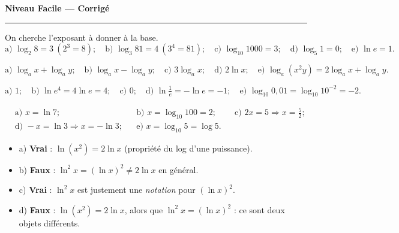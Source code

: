 \documentclass[11pt,a4paper]{article}
\begin{document}
\begin{center}
{\LARGE\bfseries\color{primarydark} Niveau Facile — Corrigé}\\[2pt]
{\color{primary}\rule{0.45\textwidth}{1.2pt}}
\end{center}
\vspace{1mm}

\begin{corrige}[la définition]
On cherche l'exposant à donner à la base.
\[ \text{a) }\log_2 8=3\ (2^3=8);\quad \text{b) }\log_3 81=4\ (3^4=81);\quad \text{c) }\log_{10}1000=3;\quad
   \text{d) }\log_5 1=0;\quad \text{e) }\ln e=1. \]
\end{corrige}

\begin{corrige}[développer]
\[ \text{a) }\log_a x+\log_a y;\quad \text{b) }\log_a x-\log_a y;\quad \text{c) }3\log_a x;\quad
   \text{d) }2\ln x;\quad \text{e) }\log_a(x^{2}y)=2\log_a x+\log_a y. \]
\end{corrige}

\begin{corrige}
\[ \text{a) }1;\quad \text{b) }\ln e^{4}=4\ln e=4;\quad \text{c) }0;\quad
   \text{d) }\ln\tfrac1e=-\ln e=-1;\quad \text{e) }\log_{10}0{,}01=\log_{10}10^{-2}=-2. \]
\end{corrige}

\begin{corrige}
\begin{align*}
&\text{a) }x=\ln 7; &&\text{b) }x=\log_{10}100=2; &&\text{c) }2x=5\Rightarrow x=\tfrac52;\\
&\text{d) }-x=\ln 3\Rightarrow x=-\ln 3; &&\text{e) }x=\log_{10}5=\log 5. &&
\end{align*}
\end{corrige}

\begin{corrige}
\begin{itemize}[leftmargin=1.4em,topsep=1pt,itemsep=1pt]
  \item a) \textbf{Vrai} : $\ln(x^{2})=2\ln x$ (propriété du log d'une puissance).
  \item b) \textbf{Faux} : $\ln^{2}x=(\ln x)^{2}\neq 2\ln x$ en général.
  \item c) \textbf{Vrai} : $\ln^{2}x$ est justement une \emph{notation} pour $(\ln x)^{2}$.
  \item d) \textbf{Faux} : $\ln(x^{2})=2\ln x$, alors que $\ln^{2}x=(\ln x)^{2}$ : ce sont deux objets différents.
\end{itemize}
\end{corrige}
\end{document}
